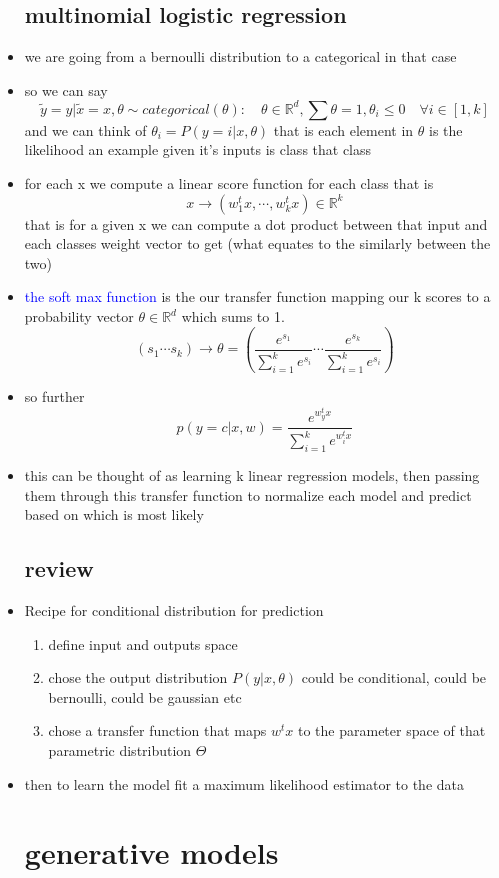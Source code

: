 \documentclass{article}
\begin{document}
\begin{itemize}
\subsection*{ multinomial logistic regression}
\item we are going from a bernoulli distribution to a categorical in that case 
\item so we can say $$\tilde{y}=y|\tilde{x}=x,\theta\sim categorical(\theta):\quad \theta\in \mathbb{R}^{d}, \sum\theta=1, \theta_i\leq0 \quad\forall i\in [1,k]$$ and we can think of $\theta_i=P(y=i|x,\theta)$ that is each element in $\theta$ is the likelihood an example given it's inputs is class that class 
\item for each x we compute a linear score function for each class  that is $$x\rightarrow (w_1^tx,\cdots , w_k^tx)\in \mathbb{R}^{k}$$ that is for a given x we can compute a dot product between that input and each classes weight vector to get (what equates to the similarly between the two) 
\item \textcolor{blue}{the soft max function} is the our transfer function mapping our k scores to a probability vector $\theta\in\mathbb{R}^{d}$ which sums to 1.  $$(s_1 \cdots s_k)\rightarrow \theta=(\frac{e^{s_1}}{\sum_{i=1}^{k}e^{s_i}}\cdots \frac{e^{s_k}}{\sum_{i=1}^{k}e^{s_i}} )$$
\item so further $$p(y=c|x,w)=\frac{e^{w_{y}^tx}}{\sum_{i=1}^{k}e^{w_{i}^{t}x}}$$
\item this can be thought of as learning k linear regression models, then passing them through this transfer function to normalize each model and predict based on which is most likely 
\subsection*{review}
\item Recipe for conditional distribution for prediction
\begin{enumerate}
    \item define input and outputs space 
    \item chose the output distribution $P(y|x,\theta)$ could be conditional, could be bernoulli, could be gaussian etc 
    \item chose a transfer function that maps $w^{t}x$ to the parameter space of that parametric distribution $\Theta$
\end{enumerate}
\item then to learn the model fit a maximum likelihood estimator to the data 
\section*{generative models}

\end{itemize}
\end{document}
